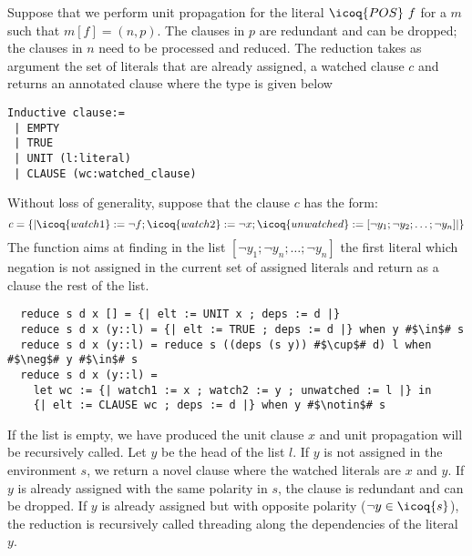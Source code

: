 \documentclass[a4paper,UKenglish,cleveref, autoref, thm-restate]{lipics-v2019}
\begin{document}
Suppose that we perform unit propagation for the literal
$\icoq{POS}\ f$ for a  $m$ such that $m[f] = (n,p)$.
The clauses in $p$ are redundant and can be dropped; the clauses in $n$
need to be processed and reduced. The reduction takes as argument the
set of literals that are already assigned, a watched clause $c$ and
returns an annotated clause  where the type
 is given below
\begin{verbatim}
Inductive clause:=
 | EMPTY  
 | TRUE
 | UNIT (l:literal)
 | CLAUSE (wc:watched_clause)
\end{verbatim}
Without loss of generality, suppose that the clause $c$ has the form:
\[
  c = \{| \icoq{watch1} := \neg f ; \icoq{watch2} := \neg x ; \icoq{unwatched} := [\neg y_1;\neg y_2;\dots;\neg y_n]|\}
\]
The  function aims at finding in the list
$[\neg y_1;\neg y_n;\dots;\neg y_n]$ the first literal which negation is not assigned in the
current set of assigned literals  and return as a clause the
rest of the
list. %
\begin{verbatim}
  reduce s d x [] = {| elt := UNIT x ; deps := d |}
  reduce s d x (y::l) = {| elt := TRUE ; deps := d |} when y #$\in$# s
  reduce s d x (y::l) = reduce s ((deps (s y)) #$\cup$# d) l when #$\neg$# y #$\in$# s
  reduce s d x (y::l) =
    let wc := {| watch1 := x ; watch2 := y ; unwatched := l |} in
    {| elt := CLAUSE wc ; deps := d |} when y #$\notin$# s
\end{verbatim}
If the list is empty, we have produced the unit clause $x$ and unit
propagation will be recursively called.  Let $y$ be the head of the list
$l$.  If $y$ is not assigned in the environment $s$, we return a
novel clause where the watched literals are $x$ and $y$.
%
If $y$ is already assigned with the same polarity in $s$, the clause
is redundant and can be dropped.  If $y$ is already assigned but with
opposite polarity ($\neg y \in \icoq{s}$), the reduction is recursively called threading along
the dependencies of the literal $y$.
%
\end{document}
